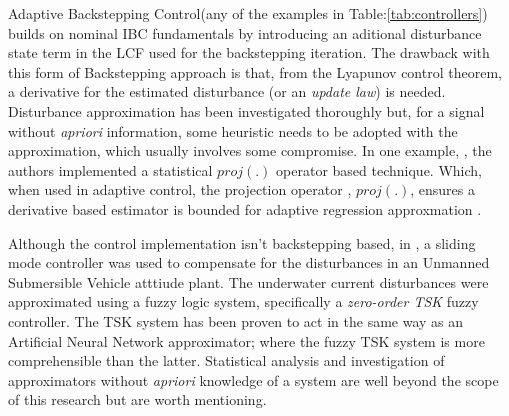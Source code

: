 \par
Adaptive Backstepping Control\cite{backstepping}(any of the examples in Table:\ref{tab:controllers}) builds on nominal IBC fundamentals by introducing an aditional disturbance state term in the LCF used for the backstepping iteration. The drawback with this form of Backstepping approach is that, from the Lyapunov control theorem, a derivative for the estimated disturbance (or an \emph{update law}) is needed. Disturbance approximation has been investigated thoroughly but, for a signal without \emph{apriori} information, some heuristic needs to be adopted with the approximation, which usually involves some compromise.
\newpage
In one example, \cite{nonlinearadaptive}, the authors implemented a statistical $proj(.)$ operator based technique. Which, when used in adaptive control, the projection operator \cite{outputfeedback}, $proj(.)$, ensures a derivative based estimator is bounded for adaptive regression approxmation \cite{nonlinearregression}.
\par
Although the control implementation isn't backstepping based, in \cite{adaptiveslidingmode}, a sliding mode controller was used to compensate for the disturbances in an Unmanned Submersible Vehicle atttiude plant. The underwater current disturbances were approximated using a fuzzy logic system, specifically a \emph{zero-order TSK} fuzzy controller. The TSK system has been proven to act in the same way as an Artificial Neural Network approximator\cite{zeroTSK}; where the fuzzy TSK system is more comprehensible than the latter. Statistical analysis and investigation of approximators without \emph{apriori} knowledge of a system are well beyond the scope of this research but are worth mentioning.
